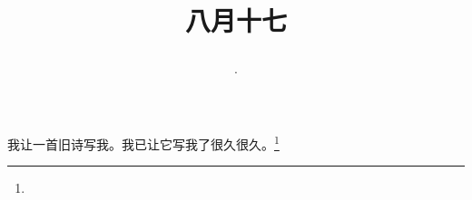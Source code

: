\title{\date[d=19,m=9,y=2024][year:cn-y,年,month:cn,day:cn,日,·,weekday]·八月十七 }
我让一首旧诗写我。我已让它写我了很久很久。\footnote{ }

